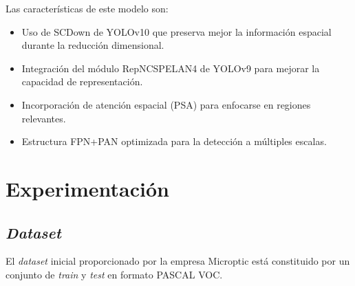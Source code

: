 \documentclass[12pt,a4paper,onecolumn,oneside]{report}
\begin{document}
\begin{table}[H]
\caption{Estructura del \textit{head} del modelo personalizado}
\centering
{}
\end{table}

Las características de este modelo son:

\begin{itemize}
  \item Uso de SCDown de YOLOv10 que preserva mejor la información espacial durante la reducción dimensional.
  \item Integración del módulo RepNCSPELAN4 de YOLOv9 para mejorar la capacidad de representación.
  \item Incorporación de atención espacial (PSA) para enfocarse en regiones relevantes.
  \item Estructura FPN+PAN optimizada para la detección a múltiples escalas.
\end{itemize}

\chapter{Experimentación} %
\label{Experimentación}

\section{\textit{Dataset}}
\label{sec:Dataset}
El \textit{dataset} inicial proporcionado por la empresa Microptic \cite{microptic} está constituido por un conjunto de \textit{train} y \textit{test} en formato PASCAL VOC.
\end{document}
